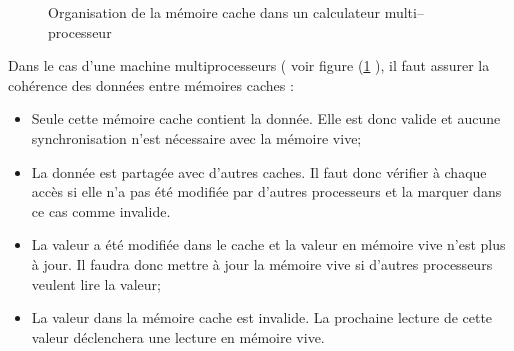 \documentclass[fleqn,11pt]{article}
\begin{document}
\begin{itemize}
\begin{itemize}
\begin{figure}[h]
\begin{center}
\end{center}
\caption{Organisation de la mémoire cache dans un calculateur multi--processeur}
\label{fig:cachemultiproc}
\end{figure}

Dans le cas d'une machine multiprocesseurs ( voir figure (\ref{fig:cachemultiproc} ), il faut assurer la cohérence des données entre mémoires caches :
\begin{itemize}
\item Seule cette mémoire cache contient la donnée. Elle est donc valide et aucune synchronisation n'est nécessaire avec la mémoire vive;
\item La donnée est partagée avec d'autres caches. Il faut donc vérifier à chaque accès si elle n'a pas été modifiée par d'autres processeurs et la marquer dans ce cas comme invalide.
\item La valeur a été modifiée dans le cache et la valeur en mémoire vive n'est plus à jour. Il faudra donc mettre à jour la mémoire vive si d'autres processeurs veulent lire la valeur;
\item La valeur dans la mémoire cache est invalide. La prochaine lecture de cette valeur déclenchera une lecture en mémoire vive. 
\end{itemize}


\end{itemize}
\end{itemize}
\end{document}
